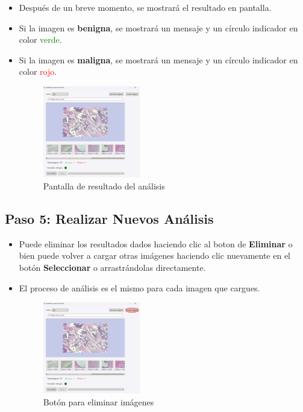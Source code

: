 \documentclass[12pt]{article} %
\begin{document}
\begin{itemize}
    \item Después de un breve momento, se mostrará el resultado en pantalla.
    \item Si la imagen es \textbf{benigna}, se mostrará un mensaje y un círculo indicador en color \textcolor{green}{verde}.
    \item Si la imagen es \textbf{maligna}, se mostrará un mensaje y un círculo indicador en color \textcolor{red}{rojo}.
    \begin{figure}[!ht]
        \centering
        \includegraphics[width=0.4\textwidth]{Ver el Resultado.png}
        \caption{Pantalla de resultado del análisis}
        \label{fig:resultado}
    \end{figure}
\end{itemize}

\subsection*{Paso 5: Realizar Nuevos Análisis}

\begin{itemize}
    \item Puede eliminar los resultados dados haciendo clic al boton de \textbf{Eliminar} o bien puede volver a cargar otras imágenes haciendo clic nuevamente en el botón \textbf{Seleccionar} o arrastrándolas directamente.
    \item El proceso de análisis es el mismo para cada imagen que cargues.
    \begin{figure}[!ht]
        \centering
        \includegraphics[width=0.4\textwidth]{EliminarImagenes.png}
        \caption{Botón para eliminar imágenes}
        \label{fig:eliminar_imagenes}
    \end{figure}
\end{itemize}
\end{document}
